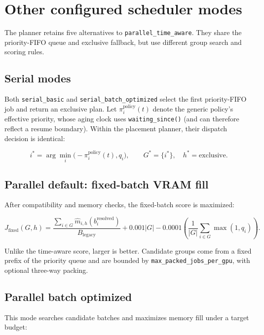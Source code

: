 \documentclass[11pt]{article}
\newcommand{\code}[1]{\textcolor{codeblue}{\texttt{#1}}}
\begin{document}
\section{Other configured scheduler modes}

The planner retains five alternatives to \code{parallel\_time\_aware}.  They
share the priority-FIFO queue and exclusive fallback, but use different group
search and scoring rules.

\subsection{Serial modes}

Both \code{serial\_basic} and \code{serial\_batch\_optimized} select the first
priority-FIFO job and return an exclusive plan.  Let
$\pi_i^{\mathrm{policy}}(t)$ denote the generic policy's effective priority,
whose aging clock uses \code{waiting\_since()} (and can therefore reflect a
resume boundary).  Within the placement planner, their dispatch decision is
identical:

\begin{equation}
  i^*=\arg\min_i\bigl(-\pi_i^{\mathrm{policy}}(t),q_i\bigr),
  \qquad G^*=\{i^*\},\quad h^*=\mathrm{exclusive}.
\end{equation}

\subsection{Parallel default: fixed-batch VRAM fill}

After compatibility and memory checks, the fixed-batch score is maximized:

\begin{equation}
  J_{\mathrm{fixed}}(G,h)
  =\frac{\sum_{i\in G}\widehat m_{i,h}(b_i^{\mathrm{resolved}})}{B_{\mathrm{legacy}}}
   +0.001|G|-0.0001\left(\frac{1}{|G|}\sum_{i\in G}\max(1,q_i)\right).
  \label{eq:fixed-score}
\end{equation}

Unlike the time-aware score, larger is better.  Candidate groups come from a
fixed prefix of the priority queue and are bounded by
\code{max\_packed\_jobs\_per\_gpu}, with optional three-way packing.

\subsection{Parallel batch optimized}

This mode searches candidate batches and maximizes memory fill under a target
budget:
\end{document}

